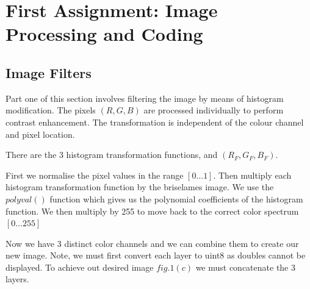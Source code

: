 \documentclass[]{assignment}
\begin{document}
\def\studentname{James Dorrian}
\def\ucdstudentnumber{13369451}


\section{{\bf First Assignment:} Image Processing and Coding}

\subsection{Image Filters} 

Part one of this section involves filtering the image by means of histogram modification. The pixels $(R,G,B)$ are processed individually to perform contrast enhancement. The transformation is independent of the colour channel and pixel location.

There are the 3 histogram transformation functions, and $(R_F,G_F,B_F)$.

First we normalise the pixel values in the range $[0\ldots 1]$.
Then multiply each histogram transformation function by the briselames image. We use the $polyval()$ function which gives us the polynomial coefficients of the histogram function. We then multiply by 255 to move back to the correct color spectrum $[0\ldots 255]$

Now we have 3 distinct color channels and we can combine them to create our new image. Note, we must first convert each layer to uint8 as doubles cannot be displayed. To achieve out desired image $fig.1(c)$ we must concatenate the 3 layers.
\end{document}
